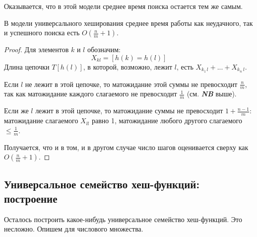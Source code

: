 Оказывается, что в этой модели среднее время поиска остается тем же самым.

\begin{theorem*}
	В модели универсального хеширования среднее время работы как неудачного, так и успешного поиска есть $O\left(\frac{n}{m}+1\right)$.
\end{theorem*}
\begin{proof}
Для элементов $k$ и $l$ обозначим:
$$X_{kl} = [h(k) = h(l)]$$
Длина цепочки $T[h(l)]$, в которой, возможно, лежит $l$, есть $X_{k_1\, l} + ... + X_{k_n\ l}$.

Если $l$ не лежит в этой цепочке, то матожидание этой суммы не превосходит $\frac{n}{m}$, так как матожидание каждого слагаемого не превосходит $\frac{1}{m}$ (см. \textit{\textbf{NB}} выше).

Если же $l$ лежит в этой цепочке, то матожидание суммы не превосходит $1 + \frac{n-1}{m}$: матожидание слагаемого $X_{ll}$ равно 1, матожидание любого другого слагаемого $\leq \frac{1}{m}$.

Получается, что и в том, и в другом случае число шагов оценивается сверху как $O\left(\frac{n}{m}+1\right)$.
\end{proof}

\subsection{Универсальное семейство хеш-функций: построение}
Осталось построить какое-нибудь универсальное семейство хеш-функций. Это несложно. Опишем для числового множества.

